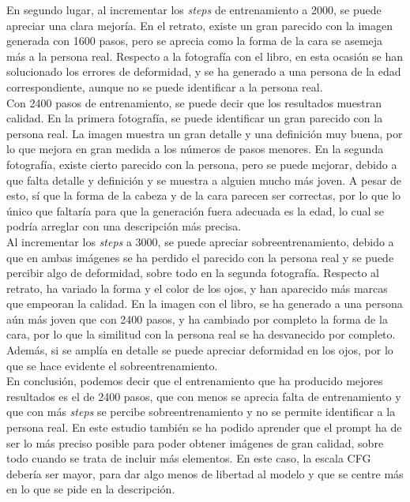 En segundo lugar, al incrementar los \textit{steps} de entrenamiento a 2000, se puede apreciar una clara mejoría. En el retrato, existe un gran parecido con la imagen generada con 1600 pasos, pero se aprecia como la forma de la cara se asemeja más a la persona real. Respecto a la fotografía con el libro, en esta ocasión se han solucionado los errores de deformidad, y se ha generado a una persona de la edad correspondiente, aunque no se puede identificar a la persona real.\\

Con 2400 pasos de entrenamiento, se puede decir que los resultados muestran calidad. En la primera fotografía, se puede identificar un gran parecido con la persona real. La imagen muestra un gran detalle y una definición muy buena, por lo que mejora en gran medida a los números de pasos menores. En la segunda fotografía, existe cierto parecido con la persona, pero se puede mejorar, debido a que falta detalle y definición y se muestra a alguien mucho más joven. A pesar de esto, sí que la forma de la cabeza y de la cara parecen ser correctas, por lo que lo único que faltaría para que la generación fuera adecuada es la edad, lo cual se podría arreglar con una descripción más precisa.\\

Al incrementar los \textit{steps} a 3000, se puede apreciar sobreentrenamiento, debido a que en ambas imágenes se ha perdido el parecido con la persona real y se puede percibir algo de deformidad, sobre todo en la segunda fotografía. Respecto al retrato, ha variado la forma y el color de los ojos, y han aparecido más marcas que empeoran la calidad. En la imagen con el libro, se ha generado a una persona aún más joven que con 2400 pasos, y ha cambiado por completo la forma de la cara, por lo que la similitud con la persona real se ha desvanecido por completo. Además, si se amplía en detalle se puede apreciar deformidad en los ojos, por lo que se hace evidente el sobreentrenamiento. \\

En conclusión, podemos decir que el entrenamiento que ha producido mejores resultados es el de 2400 pasos, que con menos se aprecia falta de entrenamiento y que con más \textit{steps} se percibe sobreentrenamiento y no se permite identificar a la persona real. En este estudio también se ha podido aprender que el prompt ha de ser lo más preciso posible para poder obtener imágenes de gran calidad, sobre todo cuando se trata de incluir más elementos. En este caso, la escala CFG debería ser mayor, para dar algo menos de libertad al modelo y que se centre más en lo que se pide en la descripción.


